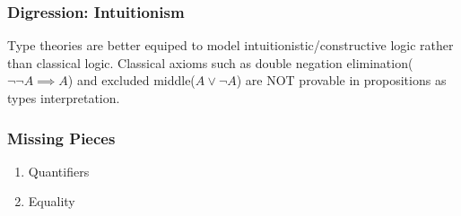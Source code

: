 \documentclass[14pt,compress]{beamer}
\begin{document}
\begin{frame}\label{frame : intuitionism}
\frametitle{Digression: Intuitionism}
\pause
Type theories are better equiped to model
\textcolor{beamer@mathtext}{intuitionistic/constructive logic}
rather than \textcolor{beamer@mathtext}{classical logic}.
\pause
Classical axioms such as
\textcolor{beamer@mathtext}{double negation elimination($\neg \neg A \implies A$)} and
\textcolor{beamer@mathtext}{excluded middle($A \vee \neg A$)}
are NOT provable in propositions as types interpretation.

\end{frame}

\begin{frame}\label{frame : missing pieces}
\frametitle{Missing Pieces}
\begin{enumerate}
\item Quantifiers
\item Equality
\end{enumerate}
\end{frame}

\begin{frame}\label{frame : }

\end{frame}
\end{document}
